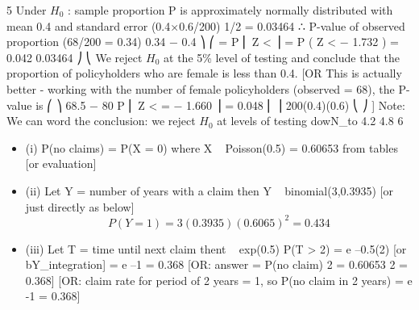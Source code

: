 \documentclass[a4paper,12pt]{article}
\begin{document}
5
Under $H_0$ : sample proportion P is approximately normally distributed with mean 0.4
and standard error (0.4×0.6/200) 1/2 = 0.03464
∴ P-value of observed proportion (68/200 = 0.34)
0.34 − 0.4 ⎞
⎛
= P ⎜ Z <
⎟ = P ( Z < − 1.732 ) = 0.042
0.03464 ⎠
⎝
We reject $H_0$ at the 5\% level of testing and conclude that the proportion of policyholders who are female is less than 0.4.
[OR This is actually better - working with the number of female policyholders (observed = 68), the P-value is
⎛
⎞
68.5 − 80
P ⎜ Z <
= − 1.660 ⎟ = 0.048
⎜
⎟
200(0.4)(0.6)
⎝
⎠
]
Note: We can word the conclusion: we reject $H_0$ at levels of testing dowN_to 4.2%
4.8%
6
\begin{itemize}
\item (i) P(no claims) = P(X = 0) where X ~ Poisson(0.5)
= 0.60653 from tables [or evaluation]
\item (ii) Let Y = number of years with a claim
then Y ~ binomial(3,0.3935) [or just directly as below]
\[P(Y = 1) = 3(0.3935)(0.6065)^2 = 0.434\]
\item (iii)
Let T = time until next claim
thent ~ exp(0.5)
P(T > 2) = e –0.5(2) [or bY_integration]
= e –1 = 0.368
[OR: answer = {P(no claim)} 2 = 0.60653 2 = 0.368]
[OR: claim rate for period of 2 years = 1, so P(no claim in 2 years)
= e -1 = 0.368]
\end{itemize}
\end{document}
